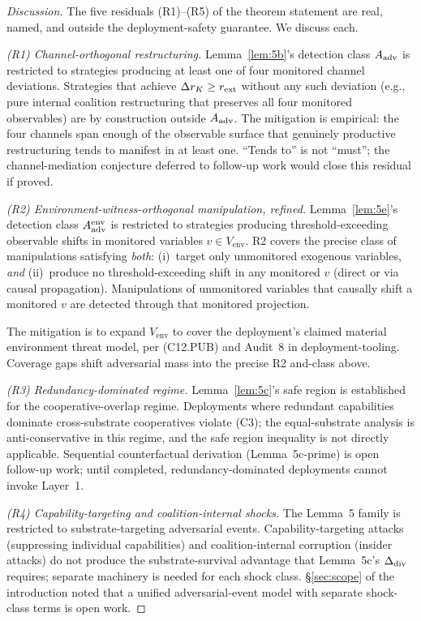 \begin{proof}[Discussion]
The five residuals (R1)--(R5) of the theorem statement are real,
named, and outside the deployment-safety guarantee. We discuss each.

\emph{(R1) Channel-orthogonal restructuring.} Lemma~\ref{lem:5b}'s
detection class $A_{\mathrm{adv}}$ is restricted to strategies producing at
least one of four monitored channel deviations. Strategies that
achieve $\Delta r_K \geq r_{\mathrm{ext}}$ without any such deviation
(e.g., pure internal coalition restructuring that preserves all
four monitored observables) are by construction outside $A_{\mathrm{adv}}$.
The mitigation is empirical: the four channels span enough of the
observable surface that genuinely productive restructuring tends to
manifest in at least one. ``Tends to'' is not ``must''; the
channel-mediation conjecture deferred to follow-up work would close
this residual if proved.

\emph{(R2) Environment-witness-orthogonal manipulation, refined.}
Lemma~\ref{lem:5e}'s detection class $A_{\mathrm{adv}}^{\mathrm{env}}$ is
restricted to strategies producing threshold-exceeding observable
shifts in monitored variables $v \in V_{\mathrm{env}}$.  R2 covers
the precise class of manipulations satisfying \emph{both}:
(i)~target only unmonitored exogenous variables, \emph{and}
(ii)~produce no threshold-exceeding shift in any monitored $v$
(direct or via causal propagation).  Manipulations of unmonitored
variables that causally shift a monitored $v$ are detected through
that monitored projection.

The mitigation is to expand $V_{\mathrm{env}}$ to cover the
deployment's claimed material environment threat model, per
(C12.PUB) and Audit~8 in deployment-tooling.  Coverage gaps shift
adversarial mass into the precise R2 and-class above.

\emph{(R3) Redundancy-dominated regime.} Lemma~\ref{lem:5c}'s safe region is
    established for the cooperative-overlap regime. Deployments where redundant
    capabilities dominate cross-substrate cooperatives violate (C3); the
    equal-substrate analysis is anti-conservative in this regime, and the safe
    region inequality is not directly applicable. Sequential counterfactual
    derivation (Lemma~5c-prime) is open follow-up work; until completed,
    redundancy-dominated deployments cannot invoke Layer~1.

\emph{(R4) Capability-targeting and coalition-internal shocks.}
The Lemma~5 family is restricted to substrate-targeting adversarial
events. Capability-targeting attacks (suppressing individual
capabilities) and coalition-internal corruption (insider attacks)
do not produce the substrate-survival advantage that Lemma~5c's
$\Delta_{\mathrm{div}}$ requires; separate machinery is needed for each shock
class. \S\ref{sec:scope} of the introduction noted that a unified
adversarial-event model with separate shock-class terms is open
work.


\end{proof}
